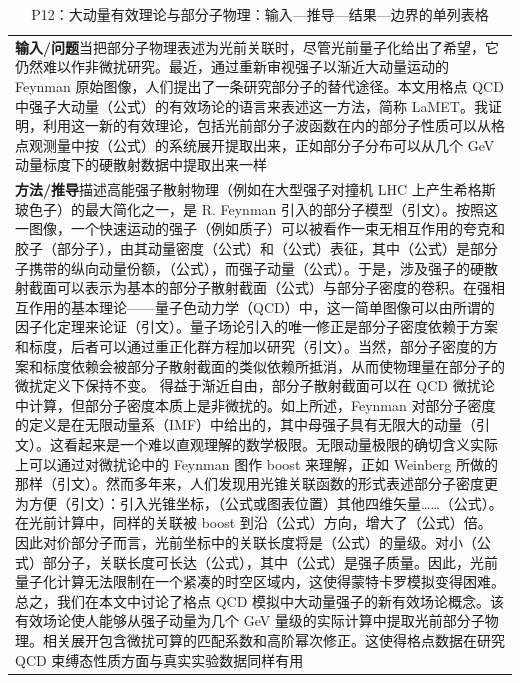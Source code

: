 \documentclass[UTF8,11pt,oneside]{ctexbook}
\begin{document}
\begin{table}[htbp]
  \centering
  \caption*{P12：大动量有效理论与部分子物理：输入—推导—结果—边界的单列表格}
  \small
  \begin{tabular}{@{}p{}@{}}
    \toprule
    \textbf{输入/问题}\quad 当把部分子物理表述为光前关联时，尽管光前量子化给出了希望，它仍然难以作非微扰研究。最近，通过重新审视强子以渐近大动量运动的 Feynman 原始图像，人们提出了一条研究部分子的替代途径。本文用格点 QCD 中强子大动量（公式）的有效场论的语言来表述这一方法，简称 LaMET。我证明，利用这一新的有效理论，包括光前部分子波函数在内的部分子性质可以从格点观测量中按（公式）的系统展开提取出来，正如部分子分布可以从几个 GeV 动量标度下的硬散射数据中提取出来一样 \\
    \textbf{方法/推导}\quad 描述高能强子散射物理（例如在大型强子对撞机 LHC 上产生希格斯玻色子）的最大简化之一，是 R. Feynman 引入的部分子模型（引文）。按照这一图像，一个快速运动的强子（例如质子）可以被看作一束无相互作用的夸克和胶子（部分子），由其动量密度（公式）和（公式）表征，其中（公式）是部分子携带的纵向动量份额，（公式），而强子动量（公式）。于是，涉及强子的硬散射截面可以表示为基本的部分子散射截面（公式）与部分子密度的卷积。在强相互作用的基本理论——量子色动力学（QCD）中，这一简单图像可以由所谓的因子化定理来论证（引文）。量子场论引入的唯一修正是部分子密度依赖于方案和标度，后者可以通过重正化群方程加以研究（引文）。当然，部分子密度的方案和标度依赖会被部分子散射截面的类似依赖所抵消，从而使物理量在部分子的微扰定义下保持不变。 得益于渐近自由，部分子散射截面可以在 QCD 微扰论中计算，但部分子密度本质上是非微扰的。如上所述，Feynman 对部分子密度的定义是在无限动量系（IMF）中给出的，其中母强子具有无限大的动量（引文）。这看起来是一个难以直观理解的数学极限。无限动量极限的确切含义实际上可以通过对微扰论中的 Feynman 图作 boost 来理解，正如 Weinberg 所做的那样（引文）。然而多年来，人们发现用光锥关联函数的形式表述部分子密度更为方便（引文）：引入光锥坐标，（公式或图表位置）其他四维矢量……（公式）。在光前计算中，同样的关联被 boost 到沿（公式）方向，增大了（公式）倍。因此对价部分子而言，光前坐标中的关联长度将是（公式）的量级。对小（公式）部分子，关联长度可长达（公式），其中（公式）是强子质量。因此，光前量子化计算无法限制在一个紧凑的时空区域内，这使得蒙特卡罗模拟变得困难。 总之，我们在本文中讨论了格点 QCD 模拟中大动量强子的新有效场论概念。该有效场论使人能够从强子动量为几个 GeV 量级的实际计算中提取光前部分子物理。相关展开包含微扰可算的匹配系数和高阶幂次修正。这使得格点数据在研究 QCD 束缚态性质方面与真实实验数据同样有用 \\

\end{tabular}
\end{table}
\end{document}
